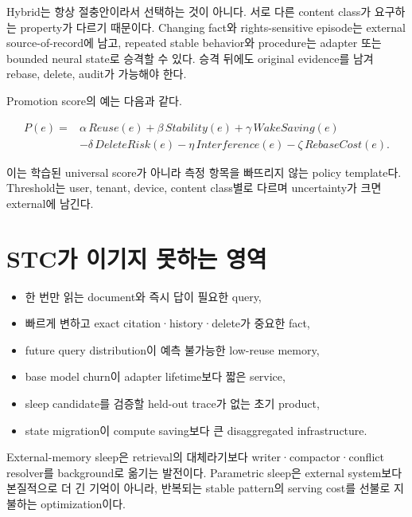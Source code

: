 Hybrid는 항상 절충안이라서 선택하는 것이 아니다. 서로 다른 content class가 요구하는 property가 다르기
때문이다. Changing fact와 rights-sensitive episode는 external source-of-record에 남고, repeated stable
behavior와 procedure는 adapter 또는 bounded neural state로 승격할 수 있다. 승격 뒤에도 original evidence를
남겨 rebase, delete, audit가 가능해야 한다.

Promotion score의 예는 다음과 같다.

\begin{align}
P(e)={}&\alpha\,Reuse(e)+\beta\,Stability(e)+\gamma\,WakeSaving(e)\nonumber\\
&-\delta\,DeleteRisk(e)-\eta\,Interference(e)-\zeta\,RebaseCost(e).
\end{align}

이는 학습된 universal score가 아니라 측정 항목을 빠뜨리지 않는 policy template다. Threshold는 user,
tenant, device, content class별로 다르며 uncertainty가 크면 external에 남긴다.

\section{STC가 이기지 못하는 영역}

\begin{itemize}
  \item 한 번만 읽는 document와 즉시 답이 필요한 query,
  \item 빠르게 변하고 exact citation·history·delete가 중요한 fact,
  \item future query distribution이 예측 불가능한 low-reuse memory,
  \item base model churn이 adapter lifetime보다 짧은 service,
  \item sleep candidate를 검증할 held-out trace가 없는 초기 product,
  \item state migration이 compute saving보다 큰 disaggregated infrastructure.
\end{itemize}

\begin{keypoint}[가장 강한 현재 판단]
External-memory sleep은 retrieval의 대체라기보다 writer·compactor·conflict resolver를 background로
옮기는 발전이다. Parametric sleep은 external system보다 본질적으로 더 긴 기억이 아니라, 반복되는
stable pattern의 serving cost를 선불로 지불하는 optimization이다.
\end{keypoint}
